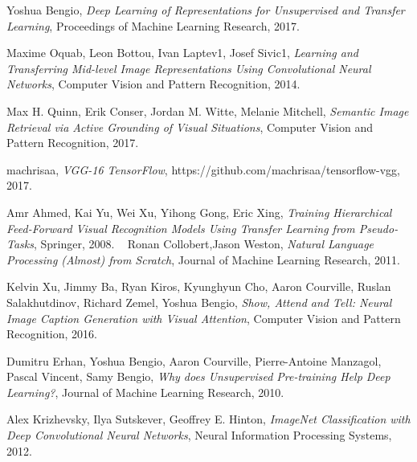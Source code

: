 \documentclass [11pt,letterpaper ,twoside ,openany ]{report}
\begin{document}
\begin{thebibliography}{9}
          Yoshua Bengio,
          \textit{Deep Learning of Representations for Unsupervised and Transfer Learning},
          Proceedings of Machine Learning Research,
          2017.                               

          Maxime Oquab, Leon Bottou, Ivan Laptev1, Josef Sivic1,
          \textit{Learning and Transferring Mid-level Image Representations Using Convolutional Neural Networks},
          Computer Vision and Pattern Recognition,
          2014.

          Max H. Quinn, Erik Conser, Jordan M. Witte, Melanie Mitchell,
          \textit{Semantic Image Retrieval via Active Grounding of Visual Situations},
          Computer Vision and Pattern Recognition,
          2017.          

          machrisaa,
          \textit{VGG-16 TensorFlow},
          https://github.com/machrisaa/tensorflow-vgg,
          2017.                    

          Amr Ahmed, Kai Yu, Wei Xu, Yihong Gong, Eric Xing,
          \textit{Training Hierarchical Feed-Forward Visual Recognition Models Using Transfer Learning from Pseudo-Tasks},
          Springer,
          2008.                                        
\          
          Ronan Collobert,Jason Weston,
          \textit{Natural Language Processing (Almost) from Scratch},
          Journal of Machine Learning Research,
          2011.                             

          Kelvin Xu, Jimmy Ba, Ryan Kiros, Kyunghyun Cho, Aaron Courville, Ruslan Salakhutdinov, Richard Zemel, Yoshua Bengio,
          \textit{Show, Attend and Tell: Neural Image Caption Generation with Visual Attention},
          Computer Vision and Pattern Recognition,
          2016.                                

          Dumitru Erhan, Yoshua Bengio, Aaron Courville, Pierre-Antoine Manzagol, Pascal Vincent, Samy Bengio,
          \textit{Why does Unsupervised Pre-training Help Deep Learning?},
          Journal of Machine Learning Research,
          2010.                                       

          Alex Krizhevsky, Ilya Sutskever, Geoffrey E. Hinton,
          \textit{ImageNet Classification with Deep Convolutional Neural Networks},
          Neural Information Processing Systems,
          2012.        


\end{thebibliography}
\end{document}
